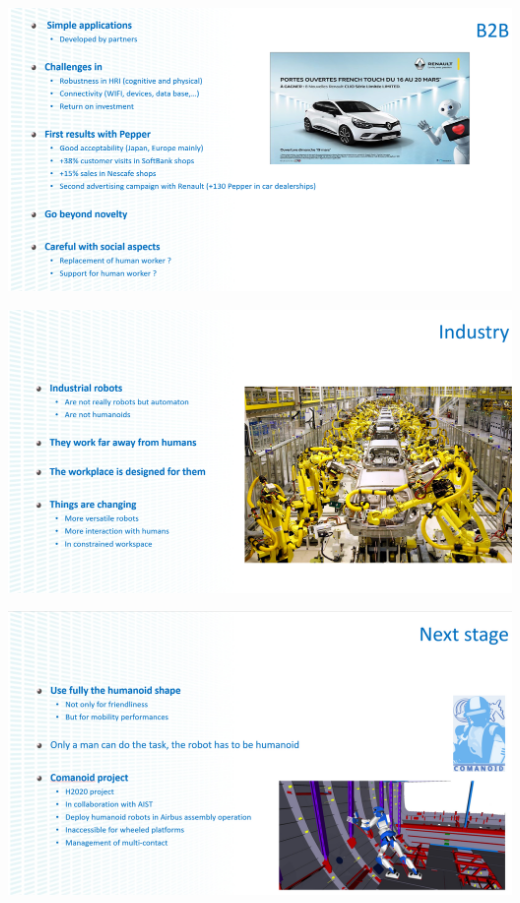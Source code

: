 \documentclass[xetex,mathserif,serif]{beamer}
\begin{document}
	\begin{frame}
		\begin{center}
			\includegraphics[width=\textwidth]{gelin10.png}
		\end{center}
	\end{frame}

	\begin{frame}
		\begin{center}
			\includegraphics[width=\textwidth]{gelin11.png}
		\end{center}
	\end{frame}

	\begin{frame}
		\begin{center}
			\includegraphics[width=\textwidth]{gelin12.png}
		\end{center}
	\end{frame}
\end{document}
